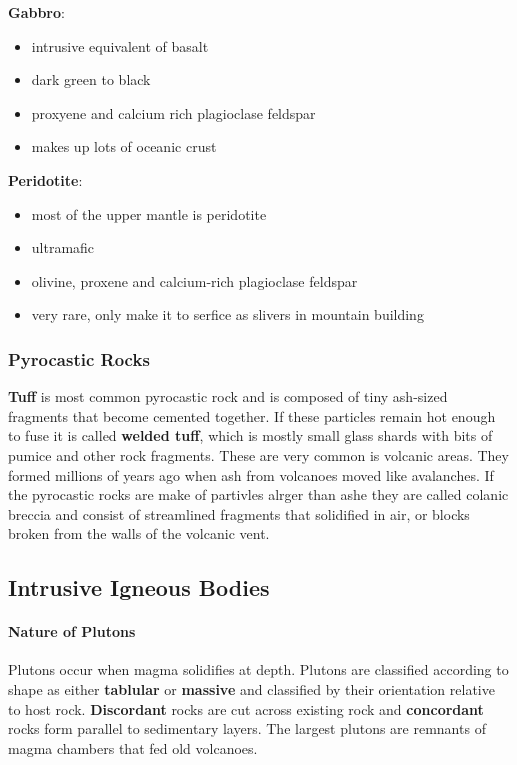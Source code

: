 \documentclass{article}
\begin{document}
\textbf{Gabbro}:
\begin{itemize}
    \item intrusive equivalent of basalt
    \item dark green to black
    \item proxyene and calcium rich plagioclase feldspar
    \item makes up lots of oceanic crust
\end{itemize}

\textbf{Peridotite}:
\begin{itemize}
    \item most of the upper mantle is peridotite
    \item ultramafic
    \item olivine, proxene and calcium-rich plagioclase feldspar
    \item very rare, only make it to serfice as slivers in mountain building
\end{itemize}

\subsubsection{Pyrocastic Rocks} %
\label{subsub:pyrocastic_rocks}
\textbf{Tuff} is most common pyrocastic rock and is composed of tiny ash-sized fragments that become cemented together. If these particles remain hot enough to fuse it is called \textbf{welded tuff}, which is mostly small glass shards with bits of pumice and other rock fragments. These are very common is volcanic areas. They formed millions of years ago when ash from volcanoes moved like avalanches. If the pyrocastic rocks are make of partivles alrger than ashe they are called colanic breccia and consist of streamlined fragments that solidified in air, or blocks broken from the walls of the volcanic vent.


\subsection{Intrusive Igneous Bodies} %
\label{sub:intrusive_igneous_bodies}
\paragraph{Nature of Plutons} %
\label{par:nature_of_plutons}
Plutons occur when magma solidifies at depth. Plutons are classified according to shape as either \textbf{tablular} or \textbf{massive} and classified by their orientation relative to host rock. \textbf{Discordant} rocks are cut across existing rock and \textbf{concordant} rocks form parallel to sedimentary layers. The largest plutons are remnants of magma chambers that fed old volcanoes.
\end{document}
